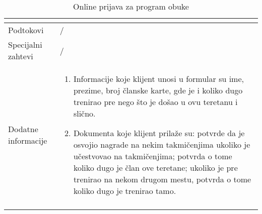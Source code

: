 \documentclass[../../main.tex]{subfiles}
\begin{document}
\begin{longtable}{| p{} | p{} |}
\begin{itemize}
    \end{itemize} \\
\hline
    Podtokovi & /\\
\hline
    Specijalni zahtevi & /\\
\hline
    Dodatne informacije &
    \begin{enumerate}
        \item Informacije koje klijent unosi u formular su ime, prezime, broj članske karte, gde je i koliko dugo trenirao pre nego što je došao u ovu teretanu i slično.
        \item Dokumenta koje klijent prilaže su: potvrde da je osvojio nagrade na nekim takmičenjima ukoliko je učestvovao na takmičenjima; potvrda o tome koliko dugo je član ove teretane; ukoliko je pre trenirao na nekom drugom mestu, potvrda o tome koliko dugo je trenirao tamo.
    \end{enumerate}\\
\hline
\caption{Online prijava za program obuke}
\end{longtable}
\end{document}
